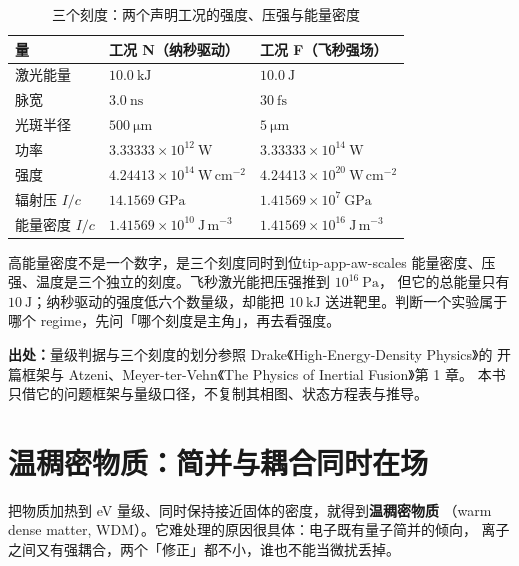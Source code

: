 \begin{table}[htbp]
\centering
\small
\caption{三个刻度：两个声明工况的强度、压强与能量密度}
\label{tab:app-aw-scales}
\begin{tabular}{p{4.0cm}p{4.4cm}p{4.4cm}}
\hline
量 & 工况 N（纳秒驱动） & 工况 F（飞秒强场） \\
\hline
激光能量 & $10.0\ \mathrm{kJ}$ & $10.0\ \mathrm{J}$ \\
脉宽 & $3.0\ \mathrm{ns}$ & $30\ \mathrm{fs}$ \\
光斑半径 & $500\ \mathrm{\mu m}$ & $5\ \mathrm{\mu m}$ \\
功率 & $3.33333\times10^{12}\ \mathrm{W}$ & $3.33333\times10^{14}\ \mathrm{W}$ \\
强度 & $4.24413\times10^{14}\ \mathrm{W\,cm^{-2}}$ & $4.24413\times10^{20}\ \mathrm{W\,cm^{-2}}$ \\
辐射压 $I/c$ & $14.1569\ \mathrm{GPa}$ & $1.41569\times10^{7}\ \mathrm{GPa}$ \\
能量密度 $I/c$ & $1.41569\times10^{10}\ \mathrm{J\,m^{-3}}$ & $1.41569\times10^{16}\ \mathrm{J\,m^{-3}}$ \\
\hline
\end{tabular}
\end{table}

\begin{tip}{高能量密度不是一个数字，是三个刻度同时到位}{tip-app-aw-scales}
能量密度、压强、温度是三个独立的刻度。飞秒激光能把压强推到 $10^{16}\ \mathrm{Pa}$，
但它的总能量只有 $10\ \mathrm{J}$；纳秒驱动的强度低六个数量级，却能把 $10\ \mathrm{kJ}$
送进靶里。判断一个实验属于哪个 regime，先问「哪个刻度是主角」，再去看强度。
\end{tip}

{\footnotesize
\textbf{出处：}量级判据与三个刻度的划分参照 Drake《High-Energy-Density Physics》的
开篇框架与 Atzeni、Meyer-ter-Vehn《The Physics of Inertial Fusion》第 1 章。
本书只借它的问题框架与量级口径，不复制其相图、状态方程表与推导。
}

\section{温稠密物质：简并与耦合同时在场}
\label{sec:app-aw-wdm}

把物质加热到 eV 量级、同时保持接近固体的密度，就得到\textbf{温稠密物质}
（warm dense matter, WDM）。它难处理的原因很具体：电子既有量子简并的倾向，
离子之间又有强耦合，两个「修正」都不小，谁也不能当微扰丢掉。

